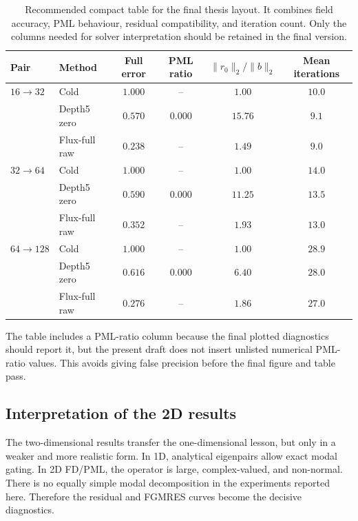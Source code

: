 \begin{table}[htbp]
\centering
\caption{Recommended compact table for the final thesis layout. It combines
field accuracy, PML behaviour, residual compatibility, and iteration count.
Only the columns needed for solver interpretation should be retained in the
final version.}
\label{tab:results-2d-compact}
\begin{tabular}{llcccc}
\toprule
Pair & Method & Full error & PML ratio & $\|r_0\|_2/\|b\|_2$ & Mean iterations \\
\midrule
$16\to32$ & Cold & $1.000$ & -- & $1.00$ & $10.0$ \\
          & Depth5 zero & $0.570$ & $0.000$ & $15.76$ & $9.1$ \\
          & Flux-full raw & $0.238$ & -- & $1.49$ & $9.0$ \\
\midrule
$32\to64$ & Cold & $1.000$ & -- & $1.00$ & $14.0$ \\
          & Depth5 zero & $0.590$ & $0.000$ & $11.25$ & $13.5$ \\
          & Flux-full raw & $0.352$ & -- & $1.93$ & $13.0$ \\
\midrule
$64\to128$ & Cold & $1.000$ & -- & $1.00$ & $28.9$ \\
           & Depth5 zero & $0.616$ & $0.000$ & $6.40$ & $28.0$ \\
           & Flux-full raw & $0.276$ & -- & $1.86$ & $27.0$ \\
\bottomrule
\end{tabular}
\end{table}

The table includes a PML-ratio column because the final plotted diagnostics
should report it, but the present draft does not insert unlisted numerical
PML-ratio values. This avoids giving false precision before the final figure
and table pass.

\subsection{Interpretation of the 2D results}
\label{subsec:results-2d-interpretation}

The two-dimensional results transfer the one-dimensional lesson, but only in a
weaker and more realistic form. In 1D, analytical eigenpairs allow exact modal
gating. In 2D FD/PML, the operator is large, complex-valued, and non-normal.
There is no equally simple modal decomposition in the experiments reported
here. Therefore the residual and FGMRES curves become the decisive diagnostics.

